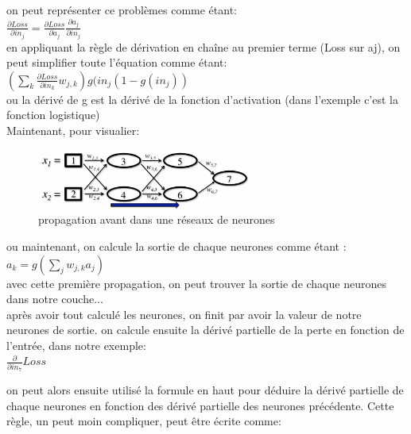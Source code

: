 \documentclass[oneside]{book}
\begin{document}
on peut représenter ce problèmes comme étant:\\

\centering
$\frac{\partial Loss}{\partial in_j} = \frac{\partial Loss}{\partial a_j} \frac{\partial a_j}{\partial in_{j}}$\\

\justify
en appliquant la règle de dérivation en chaîne au premier terme (Loss sur aj), on peut simplifier toute l'équation comme étant:\\

\centering
$(\sum\limits_k \frac{\partial Loss}{\partial in_k} w_{j,k}) g(in_j (1-g(in_j))$\\

ou la dérivé de g est la dérivé de la fonction d'activation (dans l'exemple c'est la fonction logistique)\\

\justify
Maintenant, pour visualier:\\

\begin{figure}[!ht]
\centering
\includegraphics[width=7cm]{propagation_avant.png}
\caption{propagation avant dans une réseaux de neurones}
\label{fig:propagation_avant}
\end{figure}

ou maintenant, on calcule la sortie de chaque neurones comme étant :\\

\centering
$a_k = g(\sum\limits_j w_{j,k} a_j )$\\

\justify
avec cette première propagation, on peut trouver la sortie de chaque neurones dans notre couche...\\

après avoir tout calculé les neurones, on finit par avoir la valeur de notre neurones de sortie. on calcule ensuite la dérivé partielle de la perte en fonction de l'entrée, dans notre exemple:\\

\centering
$\frac{\partial}{\partial in_7} Loss$\\
\justify

on peut alors ensuite utilisé la formule en haut pour déduire la dérivé partielle de chaque neurones en fonction des dérivé partielle des neurones précédente. Cette règle, un peut moin compliquer, peut être écrite comme:\\
\end{document}
